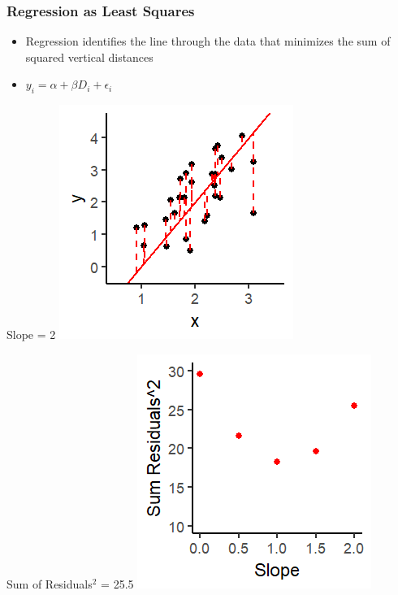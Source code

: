 \documentclass[xcolor=x11names,compress]{beamer}\usepackage[]{graphicx}\usepackage[]{color}
\makeatletter
\def\maxwidth{ %
  \ifdim\Gin@nat@width>\linewidth
    \linewidth
  \else
    \Gin@nat@width
  \fi
}
\newenvironment{knitrout}{}{} %
\renewcommand{\(}{\begin{columns}}
\renewcommand{\)}{\end{columns}}
\newcommand{\<}[1]{\begin{column}{#1}}
\renewcommand{\>}{\end{column}}
\makeatother
\begin{document}
\begin{frame}
\frametitle{Regression as Least Squares}
\begin{itemize}
\item Regression identifies the line through the data that minimizes the sum of squared vertical distances 
\item $y_i = \alpha + \beta D_i + \epsilon_i$
\end{itemize}
\begin{multicols}{2}
Slope = 2
\begin{knitrout}
\color{fgcolor}
\includegraphics[width=\maxwidth]{figure/graph_ols5-1} 

\end{knitrout}
\columnbreak
Sum of Residuals$^2$ = 25.5
\begin{knitrout}
\color{fgcolor}
\includegraphics[width=\maxwidth]{figure/graph_ssr5-1} 

\end{knitrout}
\end{multicols}
\end{frame}
\end{document}
